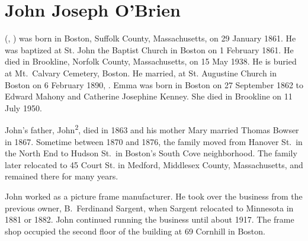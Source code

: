\section{John Joseph O'Brien}\label{per:John3OBrien}

 (, ) was born in Boston, Suffolk County, Massachusetts, on 29 January 1861.\cite{John3OBrienBirth:4} He was baptized at St. John the Baptist Church in Boston on 1 February 1861.\cite{John3OBrienBaptism} He died in Brookline, Norfolk County, Massachusetts, on 15 May 1938.\cite{John3OBrienDeath} He is buried at Mt.\ Calvary Cemetery, Boston.\cite{John3OBrienBurial:1} He married, at St. Augustine Church in Boston on 6 February 1890, .\cite{John3OBrienMarriage,John3OBrienMarriage2} Emma was born in Boston on 27 September 1862 to Edward Mahony and Catherine Josephine Kenney.\cite{EmmaMahonyBaptism} She died in Brookline on 11 July 1950.\cite{EmmaMahonyDeath}

John's father, John\textsuperscript{2}, died in 1863\cite{John2OBrienDeath:3} and his mother Mary married Thomas Bowser in 1867.\cite{MaryMahoneyBowserMarriage:3} Sometime between 1870 and 1876, the family moved from Hanover St.\ in the North End to Hudson St.\ in Boston's South Cove neighborhood.\cite{ThomasBowser1870,ThomasBowser1876} The family later relocated to 45 Court St. in Medford, Middlesex County, Massachusetts, and remained there for many years.\cite{Census1910John3OBrien,Census1930John3OBrien}

John worked as a picture frame manufacturer.  He took over the business from the previous owner, B.\ Ferdinand Sargent, when Sargent relocated to Minnesota in 1881 or 1882.\cite{PictureFrameLabel, Sargent} John continued running the business until about 1917.\cite{John3OBrien1916:1} The frame shop occupied the second floor of the building at 69 Cornhill in Boston.\cite{John3OBrien1916:2,FrameShopFire:1} 


